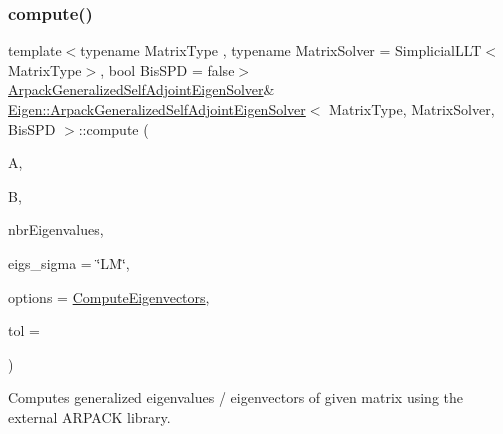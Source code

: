 \mbox{\label{class_eigen_1_1_arpack_generalized_self_adjoint_eigen_solver_af9be5d7818b4b0a7b1a7f5b2156f5814}} 
\subsubsection{\texorpdfstring{compute()}{compute()}\hspace{0.1cm}{\footnotesize\ttfamily [2/4]}}
{\footnotesize\ttfamily template$<$typename Matrix\+Type , typename Matrix\+Solver  = Simplicial\+L\+L\+T$<$\+Matrix\+Type$>$, bool Bis\+S\+PD = false$>$ \\
\hyperlink{class_eigen_1_1_arpack_generalized_self_adjoint_eigen_solver}{Arpack\+Generalized\+Self\+Adjoint\+Eigen\+Solver}\& \hyperlink{class_eigen_1_1_arpack_generalized_self_adjoint_eigen_solver}{Eigen\+::\+Arpack\+Generalized\+Self\+Adjoint\+Eigen\+Solver}$<$ Matrix\+Type, Matrix\+Solver, Bis\+S\+PD $>$\+::compute (\begin{DoxyParamCaption}\item[{const Matrix\+Type \&}]{A,  }\item[{const Matrix\+Type \&}]{B,  }\item[{Index}]{nbr\+Eigenvalues,  }\item[{std\+::string}]{eigs\+\_\+sigma = {\ttfamily \char`\"{}LM\char`\"{}},  }\item[{int}]{options = {\ttfamily \hyperlink{group__enums_ggae3e239fb70022eb8747994cf5d68b4a9ada93d8885bde32b876ba4af01d3292cc}{Compute\+Eigenvectors}},  }\item[{\hyperlink{class_eigen_1_1_arpack_generalized_self_adjoint_eigen_solver_a2555af55e53bf9de894a49e639be2e1e}{Real\+Scalar}}]{tol = {} }\end{DoxyParamCaption})}



Computes generalized eigenvalues / eigenvectors of given matrix using the external A\+R\+P\+A\+CK library. 


